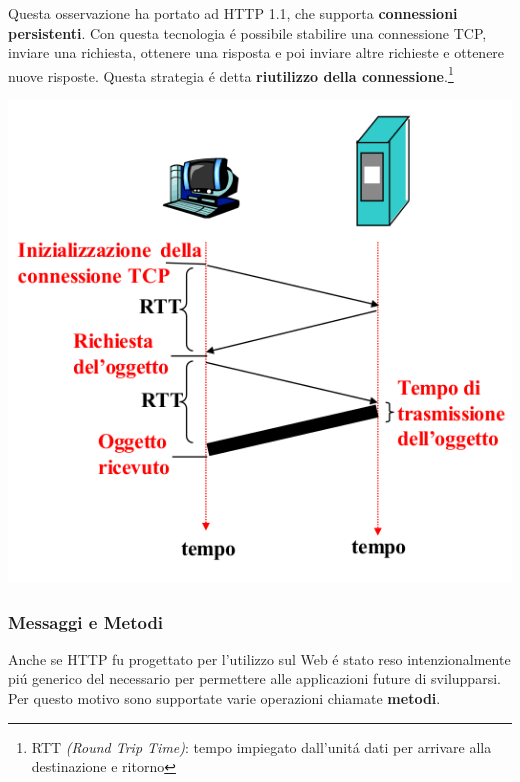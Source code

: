 \documentclass[12pt]{article}
\begin{document}
Questa osservazione ha portato ad HTTP 1.1, che supporta \textbf{connessioni persistenti}. Con questa tecnologia \'e possibile 
stabilire una connessione TCP, inviare una richiesta, ottenere una risposta e poi inviare altre richieste e ottenere nuove 
risposte. Questa strategia \'e detta \textbf{riutilizzo della connessione}.\footnote{RTT \textit{(Round Trip Time)}: tempo impiegato dall'unit\'a dati per arrivare alla destinazione e ritorno}
\begin{center}
    \includegraphics[scale=0.4]{applicazione-img8.png}
\end{center}

\subsubsection{Messaggi e Metodi}\label{web-http-http-messaggi-e-metodi}
Anche se HTTP fu progettato per l'utilizzo sul Web \'e stato reso intenzionalmente pi\'u generico del necessario per permettere 
alle applicazioni future di svilupparsi. Per questo motivo sono supportate varie operazioni chiamate \textbf{metodi}.
\end{document}
